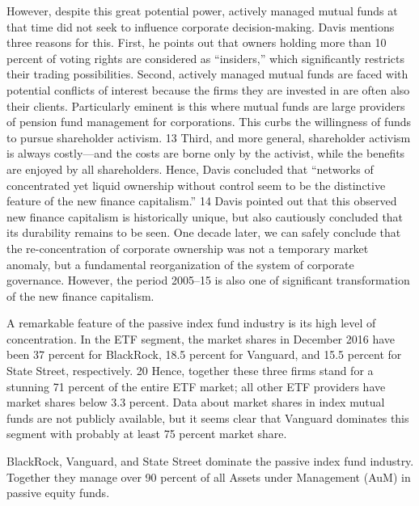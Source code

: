 \documentclass[
]{book}
\begin{document}
However, despite this great potential power, actively managed mutual funds at that time did not seek to influence corporate decision-making. Davis mentions three reasons for this. First, he points out that owners holding more than 10 percent of voting rights are considered as ``insiders,'' which significantly restricts their trading possibilities. Second, actively managed mutual funds are faced with potential conflicts of interest because the firms they are invested in are often also their clients. Particularly eminent is this where mutual funds are large providers of pension fund management for corporations. This curbs the willingness of funds to pursue shareholder activism. 13 Third, and more general, shareholder activism is always costly---and the costs are borne only by the activist, while the benefits are enjoyed by all shareholders. Hence, Davis concluded that ``networks of concentrated yet liquid ownership without control seem to be the distinctive feature of the new finance capitalism.'' 14 Davis pointed out that this observed new finance capitalism is historically unique, but also cautiously concluded that its durability remains to be seen. One decade later, we can safely conclude that the re-concentration of corporate ownership was not a temporary market anomaly, but a fundamental reorganization of the system of corporate governance. However, the period 2005--15 is also one of significant transformation of the new finance capitalism.

A remarkable feature of the passive index fund industry is its high level of concentration. In the ETF segment, the market shares in December 2016 have been 37 percent for BlackRock, 18.5 percent for Vanguard, and 15.5 percent for State Street, respectively. 20 Hence, together these three firms stand for a stunning 71 percent of the entire ETF market; all other ETF providers have market shares below 3.3 percent. Data about market shares in index mutual funds are not publicly available, but it seems clear that Vanguard dominates this segment with probably at least 75 percent market share.

BlackRock, Vanguard, and State Street dominate the passive index fund industry. Together they manage over 90 percent of all Assets under Management (AuM) in passive equity funds.
\end{document}
